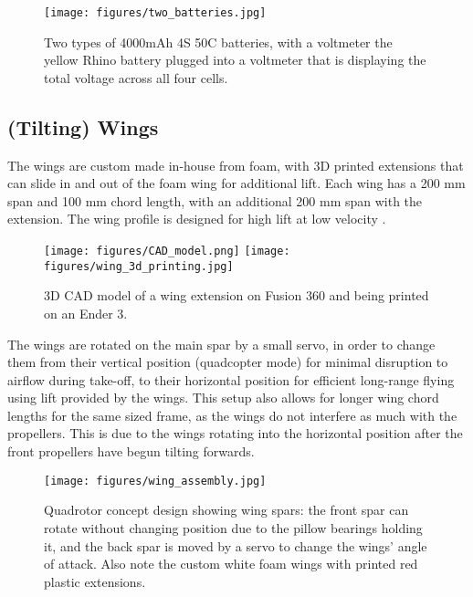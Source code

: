 \begin{figure}[htpb!]
    \centering
    \texttt{[image: figures/two\_batteries.jpg]}
    \caption{Two types of 4000mAh 4S 50C batteries, with a voltmeter the yellow Rhino battery plugged into a voltmeter that is displaying the total voltage across all four cells.}
    \label{fig:two_batteries}
\end{figure}


\subsection*{(Tilting) Wings} 
The wings are custom made in-house from foam, with 3D printed extensions that can slide in and out of the foam wing for additional lift. Each wing has a 200 \si{\milli\meter} span and 100 \si{\milli\meter} chord length, with an additional 200 \si{\milli\meter} span with the extension. The wing profile is designed for high lift at low velocity \cite{Mcmasters+1979}.

\begin{figure}[htpb!]
    \centering
    \texttt{[image: figures/CAD\_model.png]}
    \texttt{[image: figures/wing\_3d\_printing.jpg]}
    \caption{3D CAD model of a wing extension on Fusion 360 and being printed on an Ender 3.}
    \label{fig:wing_extension}
\end{figure}

The wings are rotated on the main spar by a small servo, in order to change them from their vertical position (quadcopter mode) for minimal disruption to airflow during take-off, to their horizontal position for efficient long-range flying using lift provided by the wings. This setup also allows for longer wing chord lengths for the same sized frame, as the wings do not interfere as much with the propellers. This is due to the wings rotating into the horizontal position after the front propellers have begun tilting forwards.

\begin{figure}[htpb!]
    \centering
    \texttt{[image: figures/wing\_assembly.jpg]}
    \caption{Quadrotor concept design showing wing spars: the front spar can rotate without changing position due to the pillow bearings holding it, and the back spar is moved by a servo to change the wings' angle of attack. Also note the custom white foam wings with printed red plastic extensions.}
    \label{fig:full_quadrotor}
\end{figure}




